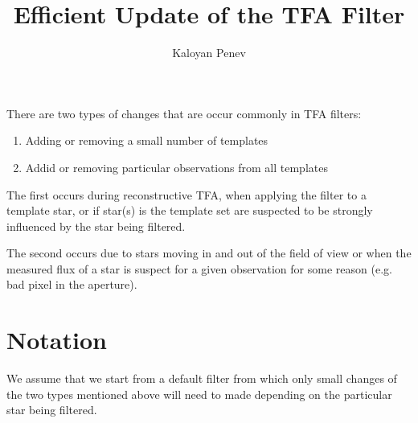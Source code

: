 \documentclass{article}
\author{Kaloyan Penev}
\title{Efficient Update of the TFA Filter}
\begin{document}
\maketitle
There are two types of changes that are occur commonly in TFA filters:
\begin{enumerate}
	\item Adding or removing a small number of templates
	\item Addid or removing particular observations from all templates
\end{enumerate}
The first occurs during reconstructive TFA, when applying the filter to a
template star, or if star(s) is the template set are suspected to be strongly
influenced by the star being filtered.

The second occurs due to stars moving in and out of the field of view or when
the measured flux of a star is suspect for a given observation for some
reason (e.g. bad pixel in the aperture). 

\section{Notation}
We assume that we start from a default filter from which only small changes
of the two types mentioned above will need to made depending on the
particular star being filtered.
\end{document}
